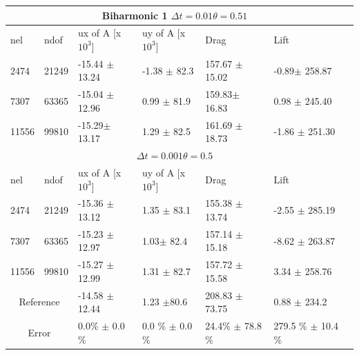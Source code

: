 \begin{table}[h!]
\centering
\label{my-label}
\begin{tabular}{ |p{1cm}||p{1cm}|p{2.7cm}|p{2.7cm}|p{2.9cm}|p{3.1cm}|p{1.2cm}|}
 \hline
  \multicolumn{6}{|c|}{Biharmonic 1 \hspace{2mm}  $\Delta t = 0.01 \theta = 0.51$} \\
   \hline
nel & ndof & ux of A [x $10^{3}$]  &uy of A [x $10^{3}$]& Drag  & Lift \\
 \hline
 2474    & 21249  & -15.44 $\pm$  13.24 & -1.38 $\pm$  82.3   & 157.67  $\pm$  15.02 & -0.89$\pm$ 258.87 \\
 7307    & 63365  & -15.04 $\pm$ 12.96  & 0.99  $\pm$ 81.9 & 159.83$\pm$  16.83 & 0.98 $\pm$  245.40  \\
 11556   & 99810  & -15.29$\pm$ 13.17   & 1.29 $\pm$ 82.5 &  161.69 $\pm$   18.73 & -1.86 $\pm$ 251.30 \\

 \hline
  \multicolumn{6}{|c|}{$\Delta t = 0.001 \theta = 0.5$} \\
   \hline
 nel & ndof & ux of A [x $10^{3}$]  &uy of A [x $10^{3}$]& Drag  & Lift \\
\hline
 2474    & 21249  & -15.36 $\pm$ 13.12 &  1.35 $\pm$ 83.1& 155.38   $\pm$   13.74 & -2.55 $\pm$ 285.19 \\ 
 7307    & 63365  & -15.23 $\pm$ 12.97 & 1.03$\pm$ 82.4 & 157.14  $\pm$  15.18 & -8.62   $\pm$  263.87 \\
 11556   & 99810  &-15.27 $\pm$ 12.99 & 1.31 $\pm$ 82.7 & 157.72  $\pm$ 15.58 & 3.34    $\pm$ 258.76  \\
 \hline
\multicolumn{2}{|c|}{Reference} & -14.58 $\pm$ 12.44   & 1.23 $\pm$80.6    & 208.83 $\pm$ 73.75 & 0.88 $\pm$ 234.2 \\
 \hline
\multicolumn{2}{|c|}{Error}  &0.0\% $\pm$ 0.0 \% & 0.0 \% $\pm$ 0.0 \% & 24.4\% $\pm$ 78.8 \% & 279.5 \% $\pm$ 10.4 \% \\
 \hline
\end{tabular}
\end{table}

